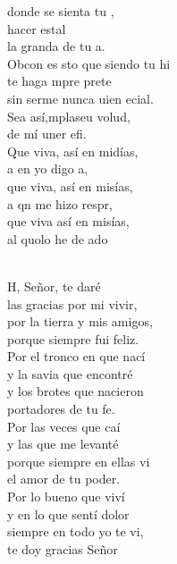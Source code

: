 \documentclass[12pt]{article}
\begin{document}
\begin{multicols*}{2}
\begin{cancion}
	donde  se sienta tu ,\\
	hacer estal\\
	la granda de tu a.\\
	Obcon es sto que siendo tu hi\\
	te haga mpre prete\\
	sin serme nunca uien ecial.\\
\jump
	Sea así,mplaseu volud, \\
	 de mí uner efi.\\
	Que viva, así en midías,\\
	a en yo digo a,\\
	que viva, así en misías,\\
	a qn me hizo respr,\\
	que viva así en misías,\\
	al quolo he de ado\\
\jump
	       \\
\end{cancion}%

\begin{cancion}%
	H, Señor, te daré \\
las gracias por mi vivir,\\
por la tierra y mis amigos, \\
porque siempre fui feliz.\\
Por el tronco en que nací \\
y la savia que encontré\\
y los brotes que nacieron \\
portadores de tu fe.\\
Por las veces que caí \\
y las que me levanté\\
porque siempre en ellas vi \\
el amor de tu poder.\\
Por lo bueno que viví \\
y en lo que sentí dolor\\
siempre en todo yo te vi, \\
te doy gracias Señor\\
\end{cancion}%


\end{multicols*}
\end{document}
